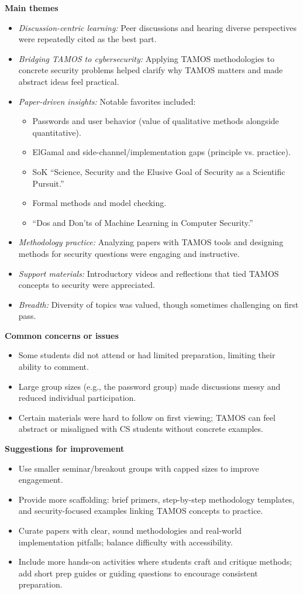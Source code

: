 \documentclass[a4paper]{report}
\begin{document}
\textbf{Main themes}
\begin{itemize}
\item \textit{Discussion-centric learning:} Peer discussions and hearing diverse perspectives were repeatedly cited as the best part.
\item \textit{Bridging TAMOS to cybersecurity:} Applying TAMOS methodologies to concrete security problems helped clarify why TAMOS matters and made abstract ideas feel practical.
\item \textit{Paper-driven insights:} Notable favorites included:
  \begin{itemize}
  \item Passwords and user behavior (value of qualitative methods alongside quantitative).
  \item ElGamal and side-channel/implementation gaps (principle vs. practice).
  \item SoK “Science, Security and the Elusive Goal of Security as a Scientific Pursuit.”
  \item Formal methods and model checking.
  \item “Dos and Don’ts of Machine Learning in Computer Security.”
  \end{itemize}
\item \textit{Methodology practice:} Analyzing papers with TAMOS tools and designing methods for security questions were engaging and instructive.
\item \textit{Support materials:} Introductory videos and reflections that tied TAMOS concepts to security were appreciated.
\item \textit{Breadth:} Diversity of topics was valued, though sometimes challenging on first pass.
\end{itemize}

\textbf{Common concerns or issues}
\begin{itemize}
\item Some students did not attend or had limited preparation, limiting their ability to comment.
\item Large group sizes (e.g., the password group) made discussions messy and reduced individual participation.
\item Certain materials were hard to follow on first viewing; TAMOS can feel abstract or misaligned with CS students without concrete examples.
\end{itemize}

\textbf{Suggestions for improvement}
\begin{itemize}
\item Use smaller seminar/breakout groups with capped sizes to improve engagement.
\item Provide more scaffolding: brief primers, step-by-step methodology templates, and security-focused examples linking TAMOS concepts to practice.
\item Curate papers with clear, sound methodologies and real-world implementation pitfalls; balance difficulty with accessibility.
\item Include more hands-on activities where students craft and critique methods; add short prep guides or guiding questions to encourage consistent preparation.
\end{itemize}
\end{document}
